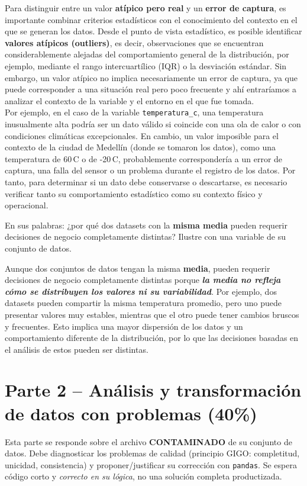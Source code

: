\documentclass[11pt]{article}
\begin{document}
Para distinguir entre un valor \textbf{atípico pero real} y un \textbf{error de captura}, es importante combinar criterios estadísticos con el conocimiento del contexto en el que se generan los datos. Desde el punto de vista estadístico, es posible identificar \textbf{valores atípicos (outliers)}, es decir, observaciones que se encuentran considerablemente alejadas del comportamiento general de la distribución, por ejemplo, mediante el rango intercuartílico (IQR) o la desviación estándar. Sin embargo, un valor atípico no implica necesariamente un error de captura, ya que puede corresponder a una situación real pero poco frecuente y ahí entraríamos a analizar el contexto de la variable y el entorno en el que fue tomada. \\Por ejemplo, en el caso de la variable \texttt{temperatura\_c}, una temperatura inusualmente alta podría ser un dato válido si coincide con una ola de calor o con condiciones climáticas excepcionales. En cambio, un valor imposible para el contexto de la ciudad de Medellín (donde se tomaron los datos), como una temperatura de 60\,\textdegree C o de -20\,\textdegree C, probablemente correspondería a un error de captura, una falla del sensor o un problema durante el registro de los datos. Por tanto, para determinar si un dato debe conservarse o descartarse, es necesario verificar tanto su comportamiento estadístico como su contexto físico y operacional.

\begin{pregunta}
En sus palabras: ¿por qué dos datasets con la \textbf{misma media} pueden requerir decisiones de negocio completamente distintas? Ilustre con una variable de su conjunto de datos.
\end{pregunta}
Aunque dos conjuntos de datos tengan la misma \textbf{media}, pueden requerir decisiones de negocio completamente distintas porque \textit{\textbf{la media no refleja cómo se distribuyen los valores ni su variabilidad}}. Por ejemplo, dos datasets pueden compartir la misma temperatura promedio, pero uno puede presentar valores muy estables, mientras que el otro puede tener cambios bruscos y frecuentes. Esto implica una mayor dispersión de los datos y un comportamiento diferente de la distribución, por lo que las decisiones basadas en el análisis de estos pueden ser distintas.


\section{Parte 2 -- Análisis y transformación de datos con problemas (40\%)}
\begin{contexto}
Esta parte se responde sobre el archivo \textbf{CONTAMINADO} de su conjunto de datos. Debe diagnosticar los problemas de calidad (principio GIGO: completitud, unicidad, consistencia) y proponer/justificar su corrección con \texttt{pandas}. Se espera código corto y \emph{correcto en su lógica}, no una solución completa productizada.
\end{contexto}
\end{document}
